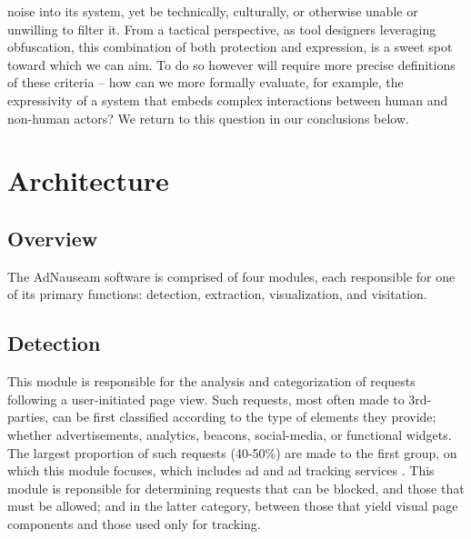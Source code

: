 \documentclass[conference]{IEEEtran}
\begin{document}
noise into its system, yet be technically, culturally, or otherwise unable or unwilling to filter it. From a tactical perspective, as tool designers leveraging obfuscation, this combination of both protection and expression, is a sweet spot toward which we can aim. To do so however will require more precise definitions of these criteria -- how can we more formally evaluate, for example, the expressivity of a system that embeds complex interactions between human and non-human actors? We return to this question in our conclusions below.


\section{Architecture}

\subsection{Overview}

The AdNauseam software is comprised of four modules, each responsible for one of its primary functions: detection, extraction, visualization, and visitation.

\subsection{Detection}

This module is responsible for the analysis and categorization of requests following a user-initiated page view. Such requests, most often made to 3rd-parties, can be first classified according to the type of elements they provide; whether advertisements, analytics, beacons, social-media, or functional widgets. The largest proportion of such requests (40-50\%) are made to the first group, on which this module focuses, which includes ad and ad tracking services \cite{Wills}. This module is reponsible for determining requests that can be blocked, and those that must be allowed; and in the latter category, between those that yield visual page components and those used only for tracking.
\end{document}
